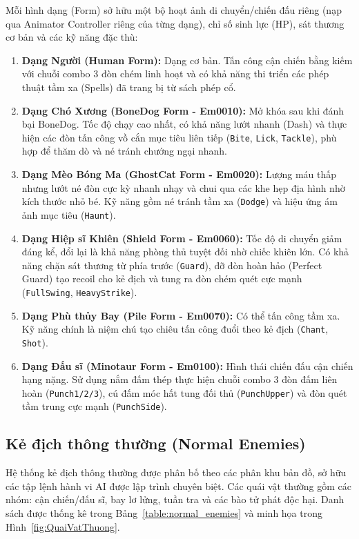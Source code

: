 \documentclass[../DoAn.tex]{subfiles}
\begin{document}
Mỗi hình dạng (Form) sở hữu một bộ hoạt ảnh di chuyển/chiến đấu riêng (nạp qua Animator Controller riêng của từng dạng), chỉ số sinh lực (HP), sát thương cơ bản và các kỹ năng đặc thù:
\begin{enumerate}
    \item \textbf{Dạng Người (Human Form):} Dạng cơ bản. Tấn công cận chiến bằng kiếm với chuỗi combo 3 đòn chém linh hoạt và có khả năng thi triển các phép thuật tầm xa (Spells) đã trang bị từ sách phép cổ.
    \item \textbf{Dạng Chó Xương (BoneDog Form - Em0010):} Mở khóa sau khi đánh bại BoneDog. Tốc độ chạy cao nhất, có khả năng lướt nhanh (Dash) và thực hiện các đòn tấn công vồ cắn mục tiêu liên tiếp (\texttt{Bite}, \texttt{Lick}, \texttt{Tackle}), phù hợp để thăm dò và né tránh chướng ngại nhanh.
    \item \textbf{Dạng Mèo Bóng Ma (GhostCat Form - Em0020):} Lượng máu thấp nhưng lướt né đòn cực kỳ nhanh nhạy và chui qua các khe hẹp địa hình nhờ kích thước nhỏ bé. Kỹ năng gồm né tránh tầm xa (\texttt{Dodge}) và hiệu ứng ám ảnh mục tiêu (\texttt{Haunt}).
    \item \textbf{Dạng Hiệp sĩ Khiên (Shield Form - Em0060):} Tốc độ di chuyển giảm đáng kể, đổi lại là khả năng phòng thủ tuyệt đối nhờ chiếc khiên lớn. Có khả năng chặn sát thương từ phía trước (\texttt{Guard}), đỡ đòn hoàn hảo (Perfect Guard) tạo recoil cho kẻ địch và tung ra đòn chém quét cực mạnh (\texttt{FullSwing}, \texttt{HeavyStrike}).
    \item \textbf{Dạng Phù thủy Bay (Pile Form - Em0070):} Có thể tấn công tầm xa. Kỹ năng chính là niệm chú tạo chiêu tấn công đuổi theo kẻ địch (\texttt{Chant}, \texttt{Shot}).
    \item \textbf{Dạng Đấu sĩ (Minotaur Form - Em0100):} Hình thái chiến đấu cận chiến hạng nặng. Sử dụng nắm đấm thép thực hiện chuỗi combo 3 đòn đấm liên hoàn (\texttt{Punch1/2/3}), cú đấm móc hất tung đối thủ (\texttt{PunchUpper}) và đòn quét tầm trung cực mạnh (\texttt{PunchSide}).
\end{enumerate}

\subsection{Kẻ địch thông thường (Normal Enemies)}
\label{subsection:3.7.2}

Hệ thống kẻ địch thông thường được phân bố theo các phân khu bản đồ, sở hữu các tập lệnh hành vi AI được lập trình chuyên biệt. Các quái vật thường gồm các nhóm: cận chiến/đấu sĩ, bay lơ lửng, tuần tra và các bào tử phát độc hại. Danh sách được thống kê trong Bảng~\ref{table:normal_enemies} và minh họa trong Hình~\ref{fig:QuaiVatThuong}.
\end{document}
